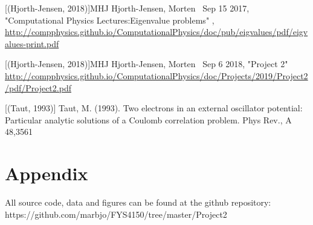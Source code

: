 \documentclass{emulateapj}
\begin{document}
\newpage
\begin{thebibliography}{}
[(Hjorth-Jensen, 2018)]{MHJ} Hjorth-Jensen, Morten \, Sep 15 2017, "Computational Physics Lectures:Eigenvalue problems" , \url{http://compphysics.github.io/ComputationalPhysics/doc/pub/eigvalues/pdf/eigvalues-print.pdf}

[(Hjorth-Jensen, 2018)]{MHJ} Hjorth-Jensen, Morten \, Sep 6 2018, "Project 2"
\url{http://compphysics.github.io/ComputationalPhysics/doc/Projects/2019/Project2/pdf/Project2.pdf}

[(Taut, 1993)] Taut, M. (1993). Two electrons in an external oscillator potential: Particular analytic solutions of a Coulomb correlation problem. Phys Rev., A 48,3561

\end{thebibliography}

\section{Appendix}
All source code, data and figures can be found at the github repository: https://github.com/marbjo/FYS4150/tree/master/Project2
\end{document}
